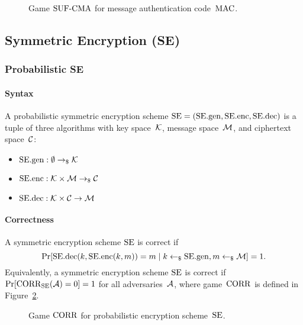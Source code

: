 \documentclass[a4paper,orivec]{llncs}
\begin{document}
\begin{figure}[!ht]
    \centering
    \nicoresetlinenr%
    \fbox{%
        \scalebox{\codescalefactor}{%
        }%
    }
    \caption{%
        Game ${\mathrm{SUF}\text{-}\mathrm{CMA}}$ for message authentication code~$\mathrm{MAC}$.
    }
    \label{fig:mac:suf}
\end{figure}


\subsection{Symmetric Encryption (SE)}

\subsubsection{Probabilistic SE}

\paragraph{Syntax}
A probabilistic symmetric encryption scheme $\mathrm{SE}=(\mathrm{SE}.\mathrm{gen},\mathrm{SE}.\mathrm{enc},\mathrm{SE}.\mathrm{dec})$ is a tuple of three algorithms with key space~$\mathcal{K}$, message space~$\mathcal{M}$, and ciphertext space~$\mathcal{C}$:

\begin{itemize}
    \item $\mathrm{SE}.\mathrm{gen}: \emptyset \to_\$ \mathcal{K}$
    \item $\mathrm{SE}.\mathrm{enc}: \mathcal{K}\times\mathcal{M} \to_\$ \mathcal{C}$
    \item $\mathrm{SE}.\mathrm{dec}: \mathcal{K}\times\mathcal{C} \to \mathcal{M}$
\end{itemize}

\paragraph{Correctness}
A symmetric encryption scheme $\mathrm{SE}$ is correct if 
\[
\Pr[\mathrm{SE}.\mathrm{dec}(k,\mathrm{SE}.\mathrm{enc}(k,m))=m\mid k\gets_\$\mathrm{SE}.\mathrm{gen},m\gets_\$\mathcal{M}]=1\text{.}
\]
Equivalently, a symmetric encryption scheme $\mathrm{SE}$ is correct if $\Pr[\mathrm{CORR}_{\mathrm{SE}}(\mathcal{A})=0]=1$ for all adversaries~$\mathcal{A}$, where game~$\mathrm{CORR}$ is defined in Figure~\ref{fig:sym:enc:corr:prob}.

\begin{figure}[!ht]
    \centering
    \nicoresetlinenr%
    \fbox{%
        \scalebox{\codescalefactor}{%
        }%
    }
    \caption{%
        Game $\mathrm{CORR}$ for probabilistic encryption scheme~$\mathrm{SE}$.
    }
    \label{fig:sym:enc:corr:prob}
\end{figure}
\end{document}
